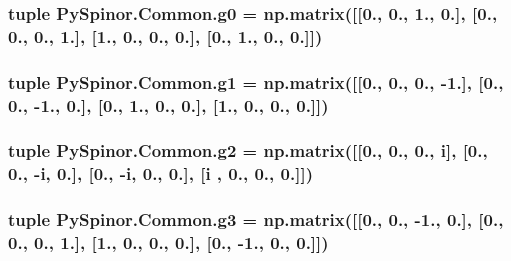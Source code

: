 \subsubsection[{g0}]{\setlength{\rightskip}{0pt plus 5cm}tuple Py\+Spinor.\+Common.\+g0 = np.\+matrix(\mbox{[}\mbox{[}0., 0., 1., 0.\mbox{]}, \mbox{[}0., 0., 0., 1.\mbox{]}, \mbox{[}1., 0., 0., 0.\mbox{]}, \mbox{[}0., 1., 0., 0.\mbox{]}\mbox{]})}\label{namespace_py_spinor_1_1_common_a2a57baccead5c121998cb60965799fe8}
\hypertarget{namespace_py_spinor_1_1_common_a4b487069e849d29175891940aebb04c7}{}
\subsubsection[{g1}]{\setlength{\rightskip}{0pt plus 5cm}tuple Py\+Spinor.\+Common.\+g1 = np.\+matrix(\mbox{[}\mbox{[}0., 0., 0., -\/1.\mbox{]}, \mbox{[}0., 0., -\/1., 0.\mbox{]}, \mbox{[}0., 1., 0., 0.\mbox{]}, \mbox{[}1., 0., 0., 0.\mbox{]}\mbox{]})}\label{namespace_py_spinor_1_1_common_a4b487069e849d29175891940aebb04c7}
\hypertarget{namespace_py_spinor_1_1_common_a980d98349414f5a8bcef127d76f0a049}{}
\subsubsection[{g2}]{\setlength{\rightskip}{0pt plus 5cm}tuple Py\+Spinor.\+Common.\+g2 = np.\+matrix(\mbox{[}\mbox{[}0., 0., 0., {\bf i}\mbox{]}, \mbox{[}0., 0., -\/{\bf i}, 0.\mbox{]}, \mbox{[}0., -\/{\bf i}, 0., 0.\mbox{]}, \mbox{[}{\bf i} , 0., 0., 0.\mbox{]}\mbox{]})}\label{namespace_py_spinor_1_1_common_a980d98349414f5a8bcef127d76f0a049}
\hypertarget{namespace_py_spinor_1_1_common_a6a1b904f2b67bd75f07e7bd2c7449c2c}{}
\subsubsection[{g3}]{\setlength{\rightskip}{0pt plus 5cm}tuple Py\+Spinor.\+Common.\+g3 = np.\+matrix(\mbox{[}\mbox{[}0., 0., -\/1., 0.\mbox{]}, \mbox{[}0., 0., 0., 1.\mbox{]}, \mbox{[}1., 0., 0., 0.\mbox{]}, \mbox{[}0., -\/1., 0., 0.\mbox{]}\mbox{]})}\label{namespace_py_spinor_1_1_common_a6a1b904f2b67bd75f07e7bd2c7449c2c}
\hypertarget{namespace_py_spinor_1_1_common_a88d9f9a7a24db07e6bef864a25c04c3d}{}
